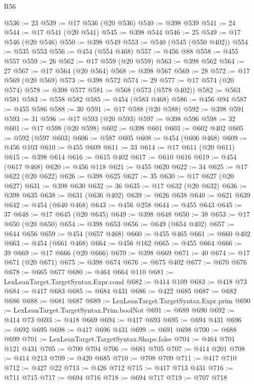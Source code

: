 \begin{lexlean}{R56}
\begin{coremodule}
@536 := 23
@539 := @17 @536 (@20 @536)
@540 := @398 @539
@541 := 24
@544 := @17 @541 (@20 @541)
@545 := @398 @544
@546 := 25
@549 := @17 @546 (@20 @546)
@550 := @398 @549
@553 := @540 (@545 (@550 @402))
@554 := @535 @553
@556 := @454 (@554 @468)
@557 := @456 @88
@558 := @455 @557
@559 := 26
@562 := @17 @559 (@20 @559)
@563 := @398 @562
@564 := 27
@567 := @17 @564 (@20 @564)
@568 := @398 @567
@569 := 28
@572 := @17 @569 (@20 @569)
@573 := @398 @572
@574 := 29
@577 := @17 @574 (@20 @574)
@578 := @398 @577
@581 := @568 (@573 (@578 @402))
@582 := @563 @581
@583 := @558 @582
@585 := @454 (@583 @468)
@586 := @456 @94
@587 := @455 @586
@588 := 30
@591 := @17 @588 (@20 @588)
@592 := @398 @591
@593 := 31
@596 := @17 @593 (@20 @593)
@597 := @398 @596
@598 := 32
@601 := @17 @598 (@20 @598)
@602 := @398 @601
@603 := @602 @402
@605 := @592 (@597 @603)
@606 := @587 @605
@608 := @454 (@606 @468)
@609 := @456 @103
@610 := @455 @609
@611 := 33
@614 := @17 @611 (@20 @611)
@615 := @398 @614
@616 := @615 @402
@617 := @610 @616
@619 := @454 (@617 @468)
@620 := @456 @118
@621 := @455 @620
@622 := 34
@625 := @17 @622 (@20 @622)
@626 := @398 @625
@627 := 35
@630 := @17 @627 (@20 @627)
@631 := @398 @630
@632 := 36
@635 := @17 @632 (@20 @632)
@636 := @398 @635
@638 := @631 (@636 @402)
@639 := @626 @638
@640 := @621 @639
@642 := @454 (@640 @468)
@643 := @456 @258
@644 := @455 @643
@645 := 37
@648 := @17 @645 (@20 @645)
@649 := @398 @648
@650 := 38
@653 := @17 @650 (@20 @650)
@654 := @398 @653
@656 := @649 (@654 @402)
@657 := @644 @656
@659 := @454 (@657 @468)
@660 := @455 @465
@661 := @660 @402
@663 := @454 (@661 @468)
@664 := @456 @162
@665 := @455 @664
@666 := 39
@669 := @17 @666 (@20 @666)
@670 := @398 @669
@671 := 40
@674 := @17 @671 (@20 @671)
@675 := @398 @674
@676 := @675 @402
@677 := @670 @676
@678 := @665 @677
@680 := @464 @664 @110
@681 := LexLeanTarget.TargetSyntax.Expr.cond
@682 := @414 @109
@683 := @418 @73
@684 := @417 @683
@685 := @684 @431
@686 := @422 @685
@687 := @682 @686
@688 := @681 @687
@689 := LexLeanTarget.TargetSyntax.Expr.prim
@690 := LexLeanTarget.TargetSyntax.Prim.boolNot
@691 := @689 @690
@692 := @414 @73
@693 := @418 @669
@694 := @417 @693
@695 := @694 @431
@696 := @692 @695
@698 := @417 @696 @431
@699 := @691 @698
@700 := @688 @699
@701 := LexLeanTarget.TargetSyntax.Shape.false
@704 := @464 @701 @121 @431
@705 := @700 @704
@706 := @681 @705
@707 := @414 @201
@708 := @414 @213
@709 := @420 @685
@710 := @708 @709
@711 := @417 @710
@712 := @427 @22
@713 := @426 @712
@715 := @417 @713 @431
@716 := @711 @715
@717 := @694 @716
@718 := @694 @717
@719 := @707 @718

\end{coremodule}
\end{lexlean}
